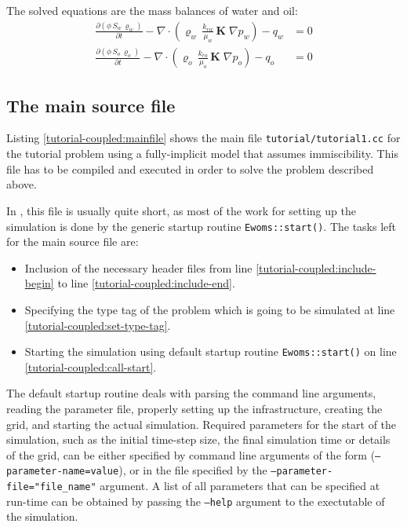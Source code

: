 The solved equations are the mass balances of water and oil:
\begin{align}
  \label{massbalancewater}
  \frac {\partial (\phi \, S_{w}\, \varrho_{w})}{\partial t}
  -
  \nabla \cdot \left( \varrho_{w} \, \frac{k_{rw}}{\mu_{w}} \, \mathbf{K}\;\nabla p_w \right)
  -
  q_w
  & =
  0 \\
  \label{massbalanceoil}
  \frac {\partial (\phi \, S_{o}\, \varrho_{o})}{\partial t}
  -
  \nabla \cdot \left( \varrho_{o} \, \frac{k_{ro}}{\mu_{o}} \, \mathbf{K}\;\nabla p_o \right)
  -
  q_o 
  & =
  0
\end{align}

\subsection{The main source file}

Listing \ref{tutorial-coupled:mainfile} shows the main file
\texttt{tutorial/tutorial1.cc} for the tutorial problem using
a fully-implicit model that assumes immiscibility. This file has to be
compiled and executed in order to solve the problem described above.

\begin{lst}\label{tutorial-coupled:mainfile} \mbox{}
  
\end{lst}

In \eWoms, this file is usually quite short, as most of the work for
setting up the simulation is done by the generic startup routine
\texttt{Ewoms::start()}. The tasks left for the main source file are:
\begin{itemize}
\item Inclusion of the necessary header files from line
  \ref{tutorial-coupled:include-begin} to line
  \ref{tutorial-coupled:include-end}.
\item Specifying the type tag of the problem which is going to be
  simulated at line \ref{tutorial-coupled:set-type-tag}.
\item Starting the simulation using default \eWoms startup routine
  \texttt{Ewoms::start()} on line \ref{tutorial-coupled:call-start}.
\end{itemize}

The default \eWoms startup routine deals with parsing the command line
arguments, reading the parameter file, properly setting up the \Dune
infrastructure, creating the grid, and starting the actual simulation.
Required parameters for the start of the simulation, such as the
initial time-step size, the final simulation time or details of the
grid, can be either specified by command line arguments of the form
(\texttt{--parameter-name=value}), or in the file specified by the
\texttt{--parameter-file="file\_name"} argument. A list of all
parameters that can be specified at run-time can be obtained by passing
the \texttt{--help} argument to the exectutable of the simulation.

